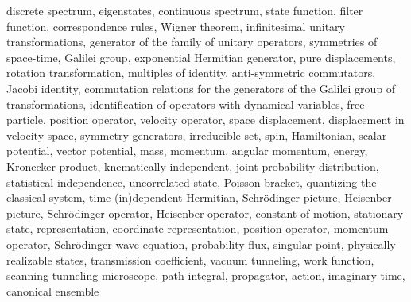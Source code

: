\begin{multicols}{3}
  discrete spectrum,
  eigenstates,
  continuous spectrum,
  state function,
  filter function,
  correspondence rules,
  Wigner theorem,
  infinitesimal unitary transformations,
  generator of the family of unitary operators,
  symmetries of space-time,
  Galilei group,
  exponential Hermitian generator,
  pure displacements,
  rotation transformation,
  multiples of identity,
  anti-symmetric commutators,
  Jacobi identity,
  commutation relations for the generators of the Galilei group of transformations,
  identification of operators with dynamical variables,
  free particle,
  position operator,
  velocity operator,
  space displacement,
  displacement in velocity space,
  symmetry generators,
  irreducible set,
  spin,
  Hamiltonian,
  scalar potential,
  vector potential,
  mass,
  momentum,
  angular momentum,
  energy,
  Kronecker product,
  knematically independent,
  joint probability distribution,
  statistical independence,
  uncorrelated state,
  Poisson bracket,
  quantizing the classical system,
  time (in)dependent Hermitian,
  Schr\"odinger picture,
  Heisenber picture,
  Schr\"odinger operator,
  Heisenber operator,
  constant of motion,
  stationary state,
  representation,
  coordinate representation,
  position operator,
  momentum operator,
  Schr\"odinger wave equation,
  probability flux,
  singular point,
  physically realizable states,
  transmission coefficient,
  vacuum tunneling,
  work function,
  scanning tunneling microscope,
  path integral,
  propagator,
  action,
  imaginary time,
  canonical ensemble  
\end{multicols}

